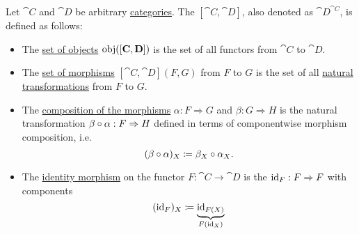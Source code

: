 \begin{definition}\label{def:functor_category}
  Let \( \cat{C} \) and \( \cat{D} \) be arbitrary \hyperref[def:category]{categories}. The  \( [\cat{C}, \cat{D}] \), also denoted as \( \cat{D}^{\cat{C}} \), is defined as follows:

  \begin{itemize}
    \item The \hyperref[def:category/objects]{set of objects} \( \operatorname{obj}([\operatorname{\mathbf{C}}, \operatorname{\mathbf{D}}]) \) is the set of all functors from \( \cat{C} \) to \( \cat{D} \).

    \item The \hyperref[def:category/morphisms]{set of morphisms} \( [\cat{C}, \cat{D}](F, G) \) from \( F \) to \( G \) is the set of all \hyperref[def:natural_transformation]{natural transformations} from \( F \) to \( G \).

    \item The \hyperref[def:category/composition]{composition of the morphisms} \( \alpha: F \Rightarrow G \) and \( \beta: G \Rightarrow H \) is the natural transformation \( \beta \bincirc \alpha: F \Rightarrow H \) defined in terms of componentwise morphism composition, i.e.
    \begin{equation}\label{eq:def:functor_category/composition}
      (\beta \bincirc \alpha)_X \coloneqq \beta_X \bincirc \alpha_X.
    \end{equation}

    \item The \hyperref[def:category/identity]{identity morphism} on the functor \( F: \cat{C} \to \cat{D} \) is the  \( \operatorname{id}_F: F \Rightarrow F \) with components
    \begin{equation}\label{eq:def:functor_category/identity}
      (\operatorname{id}_F)_X \coloneqq \underbrace{\operatorname{id}_{F(X)}}_{F(\operatorname{id}_X)}
    \end{equation}
  \end{itemize}
\end{definition}
